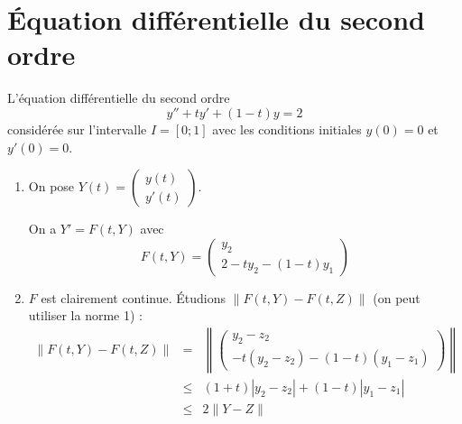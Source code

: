 \documentclass[a4paper]{article}
\begin{document}
\section{Équation différentielle du second ordre}
L'équation différentielle du second ordre 
\[y'' + ty' + (1 - t)y = 2\]
 considérée sur l'intervalle $I = [0; 1]$ avec les conditions initiales $y(0) = 0$ et $y'(0) = 0$.
\begin{enumerate}
\item  On pose $Y (t) =\left(\begin{array}{c} y(t)\\y'(t) \end{array}\right)$.

On a $Y' = F(t, Y )$ avec
\[F(t,Y) =\left(\begin{array}{c} y_2\\2-ty_2-(1-t)y_1 \end{array}\right)\]
\item $F$ est clairement continue. Étudions $\|F(t, Y )-F(t,Z)\|$ (on peut utiliser la norme 1) :
\[\begin{array}{ccl} 
\|F(t, Y )-F(t,Z)\|&= &\left\|\left(\begin{array}{c} y_2-z_2\\-t(y_2-z_2)-(1-t)(y_1-z_1) \end{array}\right)\right\|\\
&\leq & (1+t) |y_2-z_2|+(1-t)|y_1-z_1|\\
&\leq & 2\|Y-Z\|
\end{array}
\]


\end{enumerate}
\end{document}
